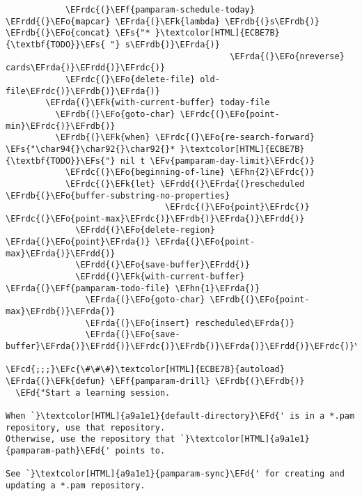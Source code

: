 \documentclass[a4wide,10pt]{article}
\newcommand{\EFc}[1]{\textcolor{EFc}{#1}} %
\newcommand{\EFcd}[1]{\textcolor{EFcd}{#1}} %
\newcommand{\EFs}[1]{\textcolor{EFs}{#1}} %
\newcommand{\EFd}[1]{\textcolor{EFd}{#1}} %
\newcommand{\EFk}[1]{\textcolor{EFk}{#1}} %
\newcommand{\EFf}[1]{\textcolor{EFf}{#1}} %
\newcommand{\EFv}[1]{\textcolor{EFv}{#1}} %
\newcommand{\EFo}[1]{\textcolor{EFo}{#1}} %
\newcommand{\EFhn}[1]{\textcolor{EFhn}{\textbf{#1}}} %
\newcommand{\EFrda}[1]{\textcolor{EFrda}{#1}} %
\newcommand{\EFrdb}[1]{\textcolor{EFrdb}{#1}} %
\newcommand{\EFrdc}[1]{\textcolor{EFrdc}{#1}} %
\newcommand{\EFrdd}[1]{\textcolor{EFrdd}{#1}} %
\begin{document}
\begin{Code}
\begin{Verbatim}
            \EFrdc{(}\EFf{pamparam-schedule-today} \EFrdd{(}\EFo{mapcar} \EFrda{(}\EFk{lambda} \EFrdb{(}s\EFrdb{)} \EFrdb{(}\EFo{concat} \EFs{"* }\textcolor[HTML]{ECBE7B}{\textbf{TODO}}\EFs{ "} s\EFrdb{)}\EFrda{)}
                                             \EFrda{(}\EFo{nreverse} cards\EFrda{)}\EFrdd{)}\EFrdc{)}
            \EFrdc{(}\EFo{delete-file} old-file\EFrdc{)}\EFrdb{)}\EFrda{)}
        \EFrda{(}\EFk{with-current-buffer} today-file
          \EFrdb{(}\EFo{goto-char} \EFrdc{(}\EFo{point-min}\EFrdc{)}\EFrdb{)}
          \EFrdb{(}\EFk{when} \EFrdc{(}\EFo{re-search-forward} \EFs{"\char94{}\char92{}\char92{}* }\textcolor[HTML]{ECBE7B}{\textbf{TODO}}\EFs{"} nil t \EFv{pamparam-day-limit}\EFrdc{)}
            \EFrdc{(}\EFo{beginning-of-line} \EFhn{2}\EFrdc{)}
            \EFrdc{(}\EFk{let} \EFrdd{(}\EFrda{(}rescheduled \EFrdb{(}\EFo{buffer-substring-no-properties}
                                \EFrdc{(}\EFo{point}\EFrdc{)} \EFrdc{(}\EFo{point-max}\EFrdc{)}\EFrdb{)}\EFrda{)}\EFrdd{)}
              \EFrdd{(}\EFo{delete-region} \EFrda{(}\EFo{point}\EFrda{)} \EFrda{(}\EFo{point-max}\EFrda{)}\EFrdd{)}
              \EFrdd{(}\EFo{save-buffer}\EFrdd{)}
              \EFrdd{(}\EFk{with-current-buffer} \EFrda{(}\EFf{pamparam-todo-file} \EFhn{1}\EFrda{)}
                \EFrda{(}\EFo{goto-char} \EFrdb{(}\EFo{point-max}\EFrdb{)}\EFrda{)}
                \EFrda{(}\EFo{insert} rescheduled\EFrda{)}
                \EFrda{(}\EFo{save-buffer}\EFrda{)}\EFrdd{)}\EFrdc{)}\EFrdb{)}\EFrda{)}\EFrdd{)}\EFrdc{)}\EFrdb{)}\EFrda{)}

\EFcd{;;;}\EFc{\#\#\#}\textcolor[HTML]{ECBE7B}{autoload}
\EFrda{(}\EFk{defun} \EFf{pamparam-drill} \EFrdb{(}\EFrdb{)}
  \EFd{"Start a learning session.

When `}\textcolor[HTML]{a9a1e1}{default-directory}\EFd{' is in a *.pam repository, use that repository.
Otherwise, use the repository that `}\textcolor[HTML]{a9a1e1}{pamparam-path}\EFd{' points to.

See `}\textcolor[HTML]{a9a1e1}{pamparam-sync}\EFd{' for creating and updating a *.pam repository.


\end{Verbatim}
\end{Code}
\end{document}

